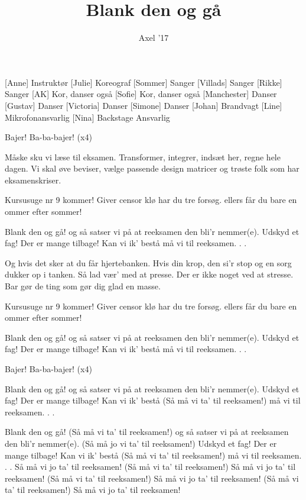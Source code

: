 \documentclass[a4paper,11pt]{article}
\title{Blank den og gå}
\author{Axel '17}
\begin{document}
\maketitle

\begin{roles}
[Anne] Instruktør
[Julie] Koreograf
[Sommer] Sanger
[Villads] Sanger
[Rikke] Sanger
[AK] Kor, danser også
[Sofie] Kor, danser også
[Manchester] Danser
[Gustav] Danser
[Victoria] Danser
[Simone] Danser
[Johan] Brandvagt
[Line] Mikrofonansvarlig
[Nina] Backstage Ansvarlig
\end{roles}

\begin{song}
 Bajer! Ba-ba-bajer! (x4)

 Måske sku vi
læse til eksamen.
Transformer, integrer, indsæt her,
regne hele dagen.
Vi skal øve beviser,
vælge passende design matricer
og trøste folk
som har eksamenskriser.

 Kursusuge nr 9 kommer!
Giver censor klø har du tre forsøg.
ellers får du bare en ommer
efter sommer!

 Blank den og gå!
og så satser vi på
at reeksamen den bli'r nemmer(e).
Udskyd et fag!
Der er mange tilbage!
Kan vi ik' bestå
må vi til reeksamen. . .

 Og hvis det sker
at du får hjertebanken.
Hvis din krop, den si'r stop
og en sorg dukker op i tanken.
Så lad vær' med at presse.
Der er ikke noget ved at stresse.
Bar gør de ting
som gør dig glad en masse.

 Kursusuge nr 9 kommer!
Giver censor klø har du tre forsøg.
ellers får du bare en ommer
efter sommer!

 Blank den og gå!
og så satser vi på
at reeksamen den bli'r nemmer(e).
Udskyd et fag!
Der er mange tilbage!
Kan vi ik' bestå
må vi til reeksamen. . .

 Bajer! Ba-ba-bajer! (x4)

 Blank den og gå!
og så satser vi på
at reeksamen den bli'r nemmer(e).
Udskyd et fag!
Der er mange tilbage!
Kan vi ik' bestå (Så må vi ta' til reeksamen!)
må vi til reeksamen. . .

 Blank den og gå! (Så må vi ta' til reeksamen!)
og så satser vi på
at reeksamen den bli'r nemmer(e). (Så må jo vi ta' til
reeksamen!)
Udskyd et fag!
Der er mange tilbage!
Kan vi ik' bestå (Så må vi ta' til reeksamen!)
må vi til reeksamen. . .
Så må vi jo ta' til reeksamen!
(Så må vi ta' til reeksamen!)
Så må vi jo ta' til reeksamen!
(Så må vi ta' til reeksamen!)
Så må vi jo ta' til reeksamen!
(Så må vi ta' til reeksamen!)
Så må vi jo ta' til reeksamen!
\end{song}
\end{document}
